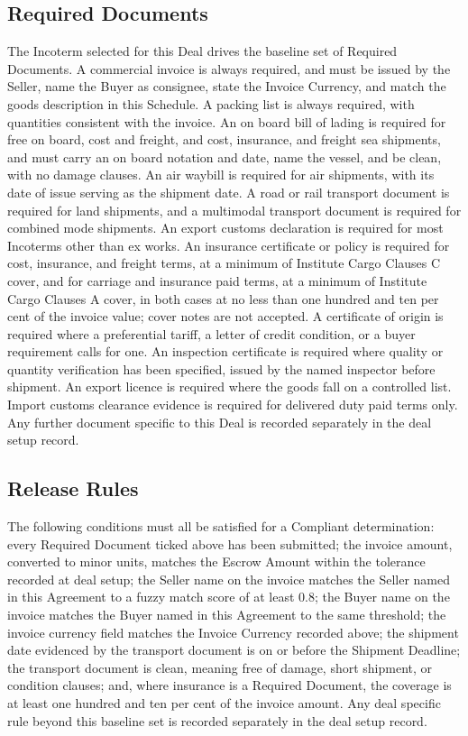 \documentclass[12pt, a4paper]{article}
\begin{document}
\subsection*{Required Documents}

The Incoterm selected for this Deal drives the baseline set of Required Documents. A
commercial invoice is always required, and must be issued by the Seller, name the Buyer as
consignee, state the Invoice Currency, and match the goods description in this Schedule. A
packing list is always required, with quantities consistent with the invoice. An on board
bill of lading is required for free on board, cost and freight, and cost, insurance, and
freight sea shipments, and must carry an on board notation and date, name the vessel, and
be clean, with no damage clauses. An air waybill is required for air shipments, with its
date of issue serving as the shipment date. A road or rail transport document is required
for land shipments, and a multimodal transport document is required for combined mode
shipments. An export customs declaration is required for most Incoterms other than ex
works. An insurance certificate or policy is required for cost, insurance, and freight
terms, at a minimum of Institute Cargo Clauses C cover, and for carriage and insurance
paid terms, at a minimum of Institute Cargo Clauses A cover, in both cases at no less than
one hundred and ten per cent of the invoice value; cover notes are not accepted. A
certificate of origin is required where a preferential tariff, a letter of credit
condition, or a buyer requirement calls for one. An inspection certificate is required
where quality or quantity verification has been specified, issued by the named inspector
before shipment. An export licence is required where the goods fall on a controlled list.
Import customs clearance evidence is required for delivered duty paid terms only. Any
further document specific to this Deal is recorded separately in the deal setup record.

\subsection*{Release Rules}

The following conditions must all be satisfied for a Compliant determination: every
Required Document ticked above has been submitted; the invoice amount, converted to minor
units, matches the Escrow Amount within the tolerance recorded at deal setup; the Seller
name on the invoice matches the Seller named in this Agreement to a fuzzy match score of
at least 0.8; the Buyer name on the invoice matches the Buyer named in this Agreement to
the same threshold; the invoice currency field matches the Invoice Currency recorded
above; the shipment date evidenced by the transport document is on or before the Shipment
Deadline; the transport document is clean, meaning free of damage, short shipment, or
condition clauses; and, where insurance is a Required Document, the coverage is at least
one hundred and ten per cent of the invoice amount. Any deal specific rule beyond this
baseline set is recorded separately in the deal setup record.
\end{document}
